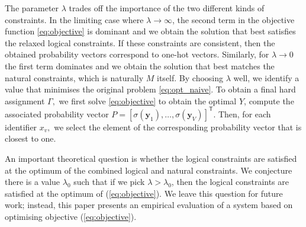 \documentclass[acmsmall, review, anonymous]{acmart}\settopmatter{printfolios=true,printccs=false,printacmref=false}
\begin{document}
The parameter $\lambda$ trades off the importance
of the two different kinds of constraints.
In the limiting case where $\lambda \rightarrow \infty$, the second term in the objective function \eqref{eq:objective} is dominant and we obtain the solution that best satisfies the relaxed
logical constraints.
If these constraints are consistent, then the obtained probability vectors correspond to one-hot vectors.
Similarly, for $\lambda \rightarrow 0$ the first term dominates and we obtain the solution that best matches the natural constraints,
which is naturally $M$ itself. By choosing $\lambda$ well,
we identify a value that minimises the original problem \eqref{eq:opt_naive}.
To obtain a final hard assignment $\Gamma,$ we first solve \eqref{eq:objective} to obtain the optimal $Y$, compute the
associated probability vector $P = [\sigma(\bm{y}_1), \ldots, \sigma(\bm{y}_{V})]^\mathsf{T}$. Then, for each identifier $x_v,$
we select the element of the
corresponding probability vector that is closest to one.

An important theoretical question is whether the logical constraints are satisfied at the optimum
of the combined logical and natural constraints.
We conjecture there is a value $\lambda_0$ such that if we pick $\lambda > \lambda_0$,
then the logical constraints are satisfied at the optimum of (\ref{eq:objective}).
We leave this question for future work; instead, this paper presents an empirical evaluation
of a system based on optimising objective (\ref{eq:objective}).




\end{document}
